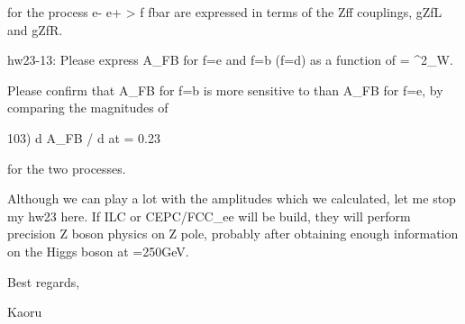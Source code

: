 \documentclass[12pt]{article}
\begin{document}
  for the process e- e+ > f fbar are expressed in terms of the
  Zff couplings, gZfL and gZfR.

hw23-13: Please express A_FB for f=e and f=b (f=d) as a function of
   = \sin^2\theta_W.

  Please confirm that A_FB for f=b is more sensitive to 
  than A_FB for f=e, by comparing the magnitudes of

  103) d A_FB / d at  = 0.23

  for the two processes.

Although we can play a lot with the amplitudes which we calculated, 
let me stop my hw23 here.  If ILC or CEPC/FCC_ee will be build, they 
will perform precision Z boson physics on Z pole, probably after 
obtaining enough information on the Higgs boson at =250GeV.

Best regards,

Kaoru
\end{document}
